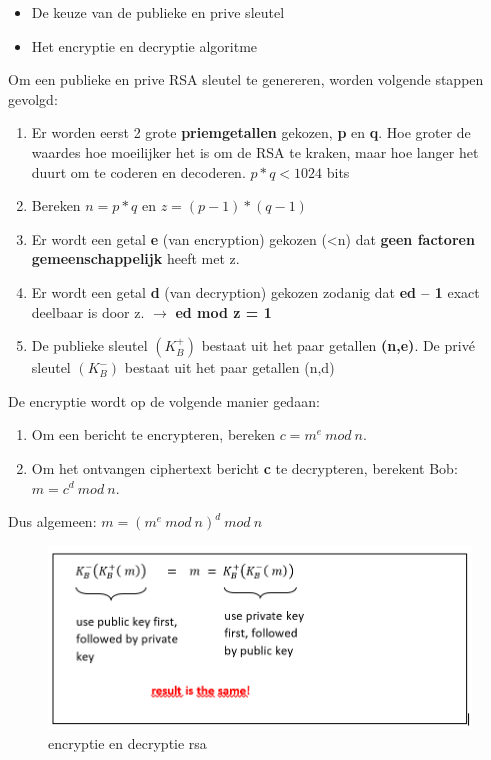 \begin{itemize}
\item De keuze van de publieke en prive sleutel
\item Het encryptie en decryptie algoritme
\end{itemize}


Om een publieke en prive RSA sleutel te genereren, worden volgende stappen gevolgd:

\begin{enumerate}
\item Er worden eerst 2 grote \textbf{priemgetallen} gekozen, \textbf{p} en \textbf{q}. Hoe groter de waardes hoe moeilijker het is om de RSA te kraken, maar hoe langer het duurt om te coderen en decoderen. $p*q < 1024$ bits
\item Bereken $n = p*q$ en $z = (p - 1)*(q - 1)$
\item Er wordt een getal \textbf{e} (van encryption) gekozen (<n) dat \textbf{geen factoren gemeenschappelijk} heeft met z.
\item Er wordt een getal \textbf{d} (van decryption) gekozen zodanig dat \textbf{ed – 1} exact deelbaar is door z. $\rightarrow$ \textbf{ed mod z = 1}
\item De publieke sleutel $(K^+_B)$ bestaat uit het paar getallen \textbf{(n,e)}. De privé sleutel $(K^-_B)$ bestaat uit het paar getallen (n,d)
\end{enumerate}


De encryptie wordt op de volgende manier gedaan:

\begin{enumerate}
\item Om een bericht te encrypteren, bereken $c = m^e\ mod\ n$.
\item Om het ontvangen ciphertext bericht \textbf{c} te decrypteren, berekent Bob: $m = c^d\ mod\ n$.
\end{enumerate}

\noindent Dus algemeen: $m = (m^e\ mod\ n)^d \ mod\ n$

\begin{figure}[h]
    \centering
    \includegraphics[width=7in]{./img/imghfdst8/diffie.PNG}
    \caption{encryptie en decryptie rsa}      
    \label{fig:encryptie en decryptie rsa }
\end{figure}

